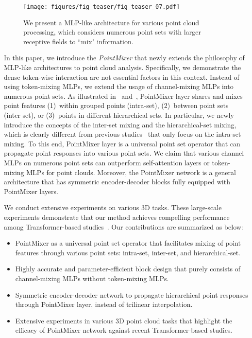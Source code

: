  \begin{wrapfigure}{r}{0.50\textwidth}
\vspace{-8mm}
\centering
\texttt{[image: figures/fig\_teaser/fig\_teaser\_07.pdf]}
\vspace{-8mm}
\caption{We present a MLP-like architecture for various point cloud processing, which considers numerous point sets with larger receptive fields to ``mix" information.}
\label{fig:fig_teaser}
\vspace{-6mm}
\end{wrapfigure} In this paper, we introduce the \emph{PointMixer} that newly extends the philosophy of MLP-like architectures to point cloud analysis. Specifically, we demonstrate the dense token-wise interaction are not essential factors in this context. Instead of using token-mixing MLPs, we extend the usage of channel-mixing MLPs into numerous point sets.
As illustrated in~ and~, PointMixer layer shares and mixes point features (1)~within grouped points (intra-set), (2)~between point sets (inter-set), or (3)~points in different hierarchical sets. 
In particular, we newly introduce the concepts of the inter-set mixing and the hierarchical-set mixing, which is clearly different from previous studies~\cite{pointmlp,pointnet++,point-transformer} that only focus on the intra-set mixing. 
To this end, PointMixer layer is a universal point set operator that can propagate point responses into various point sets. 
We claim that various channel MLPs on numerous point sets can outperform self-attention layers or token-mixing MLPs for point clouds.
Moreover, the PointMixer network is a general architecture that has symmetric encoder-decoder blocks fully equipped with PointMixer layers. 

We conduct extensive experiments on various 3D tasks.
These large-scale experiments demonstrate that our method achieves compelling performance among Transformer-based studies~\cite{cloud-transformer,point-transformer}. Our contributions are summarized as below:
\begin{itemize}
\renewcommand{\labelitemi}{}
    \item PointMixer as a universal point set operator that facilitates mixing of point features through various point sets: intra-set, inter-set, and hierarchical-set. \item Highly accurate and parameter-efficient block design that purely consists of channel-mixing MLPs without token-mixing MLPs.
    \item Symmetric encoder-decoder network to propagate hierarchical point responses through PointMixer layer, instead of trilinear interpolation.
    \item Extensive experiments in various 3D point cloud tasks that highlight the efficacy of PointMixer network against recent Transformer-based studies. \end{itemize}


